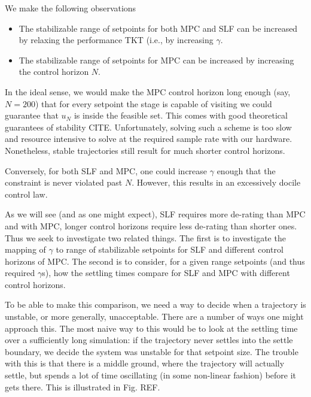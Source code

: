 \documentclass[journal,twocolumn,twoside]{IEEEtran}
\begin{document}
We make the following observations
\begin{itemize}
\item The stabilizable range of setpoints for both MPC and SLF can be increased by relaxing the performance TKT (i.e., by increasing $\gamma$.
\item The stabilizable range of setpoints for MPC can be increased by increasing the control horizon $N$.
\end{itemize}

In the ideal sense, we would make the MPC control horizon long enough (say, $N=200$) that for every setpoint the stage is capable of visiting we could guarantee that $u_N$ is inside the feasible set. This comes with good theoretical guarantees of stability CITE. Unfortunately, solving such a scheme is too slow and resource intensive to solve at the required sample rate with our hardware. Nonetheless, stable trajectories still result for much shorter control horizons. 

Conversely, for both SLF and MPC, one could increase $\gamma$ enough that the constraint is never violated past $N$. However, this results in an excessively docile control law.

As we will see (and as one might expect), SLF requires more de-rating than MPC and with MPC, longer control horizons require less de-rating than shorter ones. Thus we seek to investigate two related things. The first is to investigate the mapping of $\gamma$ to range of stabilizable setpoints for SLF and different control horizons of MPC. The second is to consider, for a given range setpoints (and thus required $\gamma$s), how the settling times compare for SLF and MPC with different control horizons.

To be able to make this comparison, we need a way to decide when a trajectory is unstable, or more generally, unacceptable. There are a number of ways one might approach this. The most naive way to this would be to look at the settling time over a sufficiently long simulation: if the trajectory never settles into the settle boundary, we decide the system was unstable for that setpoint size. The trouble with this is that there is a middle ground, where the trajectory will actually settle, but spends a lot of time oscillating (in some non-linear fashion) before it gets there. This is illustrated in Fig. REF. 

 
\end{document}
